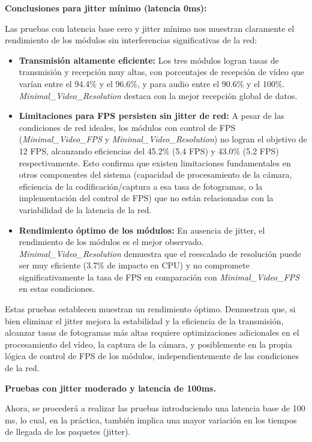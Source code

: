 \textbf{Conclusiones para jitter mínimo (latencia 0ms):}

Las pruebas con latencia base cero y jitter mínimo nos muestran claramente el rendimiento de los módulos sin interferencias significativas de la red:

\begin{itemize}
\item \textbf{Transmisión altamente eficiente:} Los tres módulos logran tasas de transmisión y recepción muy altas, con porcentajes de recepción de vídeo que varían entre el 94.4\% y el 96.6\%, y para audio entre el 90.6\% y el 100\%. \textit{Minimal\_Video\_Resolution} destaca con la mejor recepción global de datos.
\item \textbf{Limitaciones para FPS persisten sin jitter de red:} A pesar de las condiciones de red ideales, los módulos con control de FPS (\textit{Minimal\_Video\_FPS} y \textit{Minimal\_Video\_Resolution}) no logran el objetivo de 12 FPS, alcanzando eficiencias del 45.2\% (5.4 FPS) y 43.0\% (5.2 FPS) respectivamente. Esto confirma que existen limitaciones fundamentales en otros componentes del sistema (capacidad de procesamiento de la cámara, eficiencia de la codificación/captura a esa tasa de fotogramas, o la implementación del control de FPS) que no están relacionadas con la variabilidad de la latencia de la red.
\item \textbf{Rendimiento óptimo de los módulos:} En ausencia de jitter, el rendimiento de los módulos es el mejor observado. \textit{Minimal\_Video\_Resolution} demuestra que el reescalado de resolución puede ser muy eficiente (3.7\% de impacto en CPU) y no compromete significativamente la tasa de FPS en comparación con \textit{Minimal\_Video\_FPS} en estas condiciones.
\end{itemize}

Estas pruebas establecen muestran un rendimiento óptimo. Demuestran que, si bien eliminar el jitter mejora la estabilidad y la eficiencia de la transmisión, alcanzar tasas de fotogramas más altas requiere optimizaciones adicionales en el procesamiento del vídeo, la captura de la cámara, y posiblemente en la propia lógica de control de FPS de los módulos, independientemente de las condiciones de la red.
\newpage

\textbf{Pruebas con jitter moderado y latencia de 100ms.}
\vspace{\baselineskip}

Ahora, se procederá a realizar las pruebas introduciendo una latencia base de 100 ms, lo cual, en la práctica, también implica una mayor variación en los tiempos de llegada de los paquetes (jitter).
\vspace{\baselineskip}

